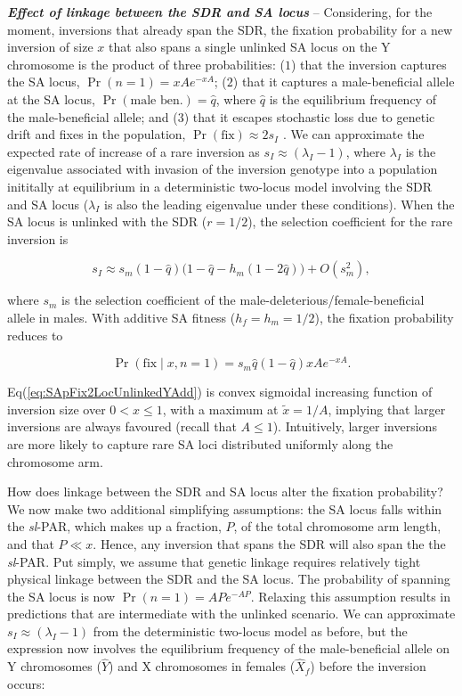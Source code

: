 \documentclass{article}
\begin{document}
{\bf \itshape Effect of linkage between the SDR and SA locus} -- Considering, for the moment, inversions that already span the SDR, the fixation probability for a new inversion of size $x$ that also spans a single unlinked SA locus on the Y chromosome is the product of three probabilities: ($1$) that the inversion captures the SA locus, $\Pr(n = 1) = xA e^{-xA}$; ($2$) that it captures a male-beneficial allele at the SA locus, $\Pr(\text{male~ben.}) = \hat{q}$, where $\hat{q}$ is the equilibrium frequency of the male-beneficial allele; and ($3$) that it escapes stochastic loss due to genetic drift and fixes in the population, $\Pr(\text{fix}) \approx 2 s_I$ \cite{Haldane1927}. We can approximate the expected rate of increase of a rare inversion as $s_I \approx (\lambda_I - 1)$, where $\lambda_I$ is the eigenvalue associated with invasion of the inversion genotype into a population inititally at equilibrium in a deterministic two-locus model involving the SDR and SA locus ($\lambda_I$ is also the leading eigenvalue under these conditions). When the SA locus is unlinked with the SDR ($r = 1/2$), the selection coefficient for the rare inversion is

\begin{equation}\label{eq:SApFix2LocUnlinked}
	s_I \approx s_m (1 - \hat{q}) \big( 1 - \hat{q} - h_m(1 - 2\hat{q}) \big) + O(s_{m}^{2}),
\end{equation}

\noindent where $s_m$ is the selection coefficient of the male-deleterious/female-beneficial allele in males. With additive SA fitness ($h_f = h_m = 1/2$), the fixation probability reduces to

\begin{equation}\label{eq:SApFix2LocUnlinkedYAdd}
	\Pr(\text{fix} \mid x,n=1) = s_m \hat{q}(1 - \hat{q}) xA e^{-xA}.
\end{equation}

\noindent Eq(\ref{eq:SApFix2LocUnlinkedYAdd}) is convex sigmoidal increasing function of inversion size over $0 < x \leq 1$, with a maximum at $\tilde{x} = 1/A $, implying that larger inversions are always favoured (recall that $A \leq 1 $). Intuitively, larger inversions are more likely to capture rare SA loci distributed uniformly along the chromosome arm.

How does linkage between the SDR and SA locus alter the fixation probability? We now make two additional simplifying assumptions: the SA locus falls within the {\itshape sl}-PAR, which makes up a fraction, $P$, of the total chromosome arm length, and that $P \ll x$. Hence, any inversion that spans the SDR will also span the the {\itshape sl}-PAR. Put simply, we assume that genetic linkage requires relatively tight physical linkage between the SDR and the SA locus. The probability of spanning the SA locus is now $\Pr(n = 1) = AP e^{-AP}$. Relaxing this assumption results in predictions that are intermediate with the unlinked scenario. We can approximate $s_I \approx (\lambda_I - 1)$ from the deterministic two-locus model as before, but the expression now involves the equilibrium frequency of the male-beneficial allele on Y chromosomes ($\hat{Y}$) and X chromosomes in females ($\hat{X}_f$) before the inversion occurs:
\end{document}
